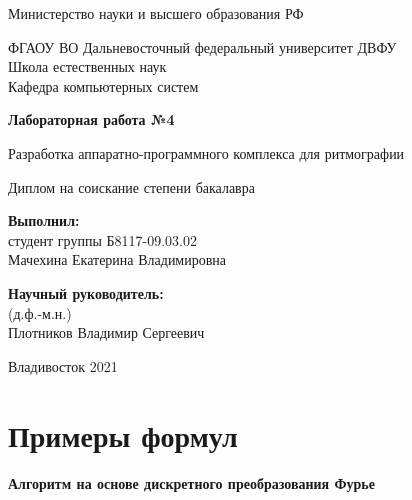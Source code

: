\documentclass[a4paper,12pt]{article}         %
\begin{document}
\begin{titlepage}
\begin{center}
Министерство науки и высшего образования РФ

ФГАОУ ВО Дальневосточный федеральный университет \flqq ДВФУ\frqq\\

Школа естественных наук\\
Кафедра компьютерных систем\\
\end{center}

\vspace{5cm}

\begin{center}
\LARGE \bf{Лабораторная работа №4}
\end{center}

\begin{center}\large
Разработка аппаратно-программного комплекса для ритмографии
\end{center}

\begin{center}\large
Диплом на соискание степени бакалавра
\end{center}

\vspace{3cm}

\large
\begin{flushright}
\textbf{Выполнил:}\\
студент группы Б8117-09.03.02\\
Мачехина Екатерина Владимировна\\

\vspace{1cm}

\textbf{Научный руководитель:}\\
(д.ф.-м.н.) \\
Плотников Владимир Сергеевич
\end{flushright}

\vspace{1cm}

\begin{center}
Владивосток 2021
\end{center}
\end{titlepage}

\tableofcontents

\newpage
\section{Примеры формул}
\paragraph{Алгоритм на основе дискретного преобразования Фурье}
\end{document}
